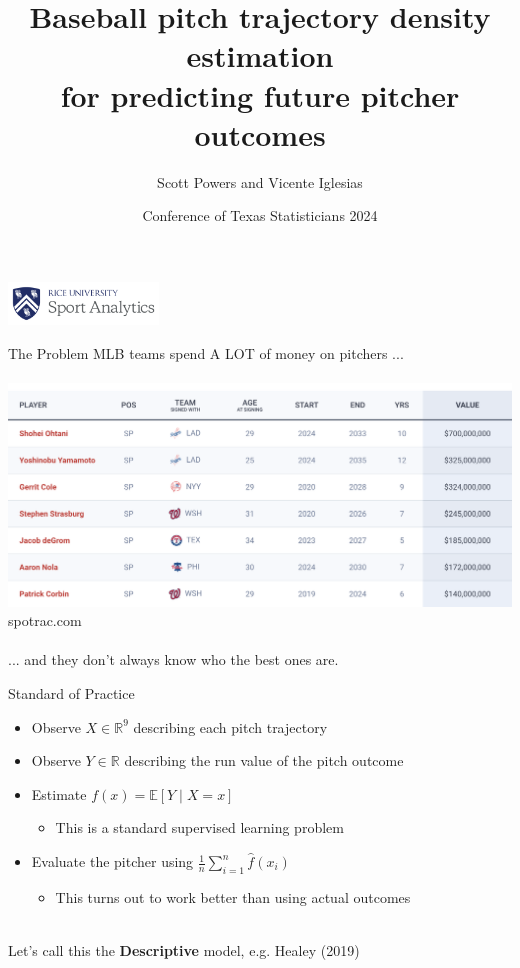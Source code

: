 \documentclass{beamer}
\title{Baseball pitch trajectory density estimation \\ for predicting future pitcher outcomes}
\author{\color{ricerichblue} Scott Powers and Vicente Iglesias}
\date{Conference of Texas Statisticians 2024}
\begin{document}
  \begin{frame}
    \maketitle
    \vfill
    \hfill
    \includegraphics[width = 4cm]{images/rice_logo.png}
  \end{frame}

  \begin{frame}{The Problem}
    MLB teams spend A LOT of money on pitchers ...\\
    ~\\
    \includegraphics[width = \textwidth]{images/free_agent_contracts.png}\\
    \hfill{\scriptsize \color{ricegray} spotrac.com}\\
    ~\\
    \hfill ... and they don't always know who the best ones are.
  \end{frame}

  \begin{frame}{Standard of Practice}
    \begin{itemize}
      \item Observe $X \in \mathbb{R}^9$ describing each pitch trajectory
      \item Observe $Y \in \mathbb{R}$ describing the run value of the pitch outcome
      \item Estimate $f(x) = \mathbb{E}[Y \mid X = x]$
      \begin{itemize}
        \item This is a standard supervised learning problem
      \end{itemize}
      \item Evaluate the pitcher using $\frac1n\sum_{i = 1}^n \hat f(x_i)$
      \begin{itemize}
        \item This turns out to work better than using actual outcomes
      \end{itemize}
    \end{itemize}
    ~\\
    Let's call this the {\bf Descriptive} model, e.g. Healey (2019)
  \end{frame}
\end{document}
